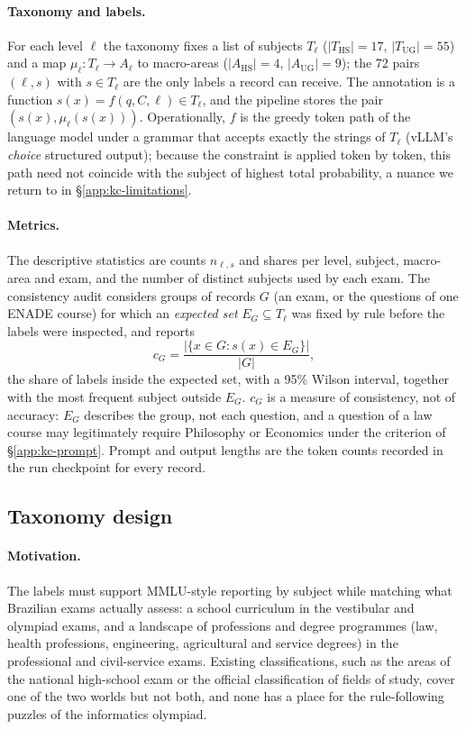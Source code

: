 \paragraph{Taxonomy and labels.} For each level $\ell$ the taxonomy fixes a
list of subjects $T_\ell$ ($|T_{\mathrm{HS}}|=17$, $|T_{\mathrm{UG}}|=55$)
and a map $\mu_\ell\colon T_\ell\to A_\ell$ to macro-areas
($|A_{\mathrm{HS}}|=4$, $|A_{\mathrm{UG}}|=9$); the 72 pairs $(\ell,s)$ with
$s\in T_\ell$ are the only labels a record can receive. The annotation is a
function $s(x)=f(q,C,\ell)\in T_\ell$, and the pipeline stores the pair
$(s(x),\mu_\ell(s(x)))$. Operationally, $f$ is the greedy token path of the
language model under a grammar that accepts exactly the strings of $T_\ell$
(vLLM's \emph{choice} structured output); because the constraint is applied
token by token, this path need not coincide with the subject of highest
total probability, a nuance we return to in \S\ref{app:kc-limitations}.

\paragraph{Metrics.} The descriptive statistics are counts $n_{\ell,s}$ and
shares per level, subject, macro-area and exam, and the number of distinct
subjects used by each exam. The consistency audit considers groups of
records $G$ (an exam, or the questions of one ENADE course) for which an
\emph{expected set} $E_G\subseteq T_\ell$ was fixed by rule before the labels
were inspected, and reports
\begin{equation*}
c_G=\frac{|\{x\in G: s(x)\in E_G\}|}{|G|},
\end{equation*}
the share of labels inside the expected set, with a 95\% Wilson interval,
together with the most frequent subject outside $E_G$. $c_G$ is a measure of
consistency, not of accuracy: $E_G$ describes the group, not each question,
and a question of a law course may legitimately require Philosophy or
Economics under the criterion of \S\ref{app:kc-prompt}. Prompt and output
lengths are the token counts recorded in the run checkpoint for every record.

\subsection{Taxonomy design}
\label{app:kc-taxonomy}

\paragraph{Motivation.} The labels must support MMLU-style reporting by
subject while matching what Brazilian exams actually assess: a school
curriculum in the vestibular and olympiad exams, and a landscape of
professions and degree programmes (law, health professions, engineering,
agricultural and service degrees) in the professional and civil-service
exams. Existing classifications, such as the areas of the national
high-school exam or the official classification of fields of study, cover
one of the two worlds but not both, and none has a place for the
rule-following puzzles of the informatics olympiad.

